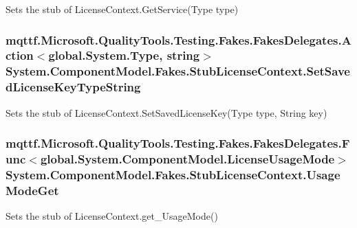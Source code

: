 Sets the stub of License\-Context.\-Get\-Service(\-Type type)

\hypertarget{class_system_1_1_component_model_1_1_fakes_1_1_stub_license_context_a175c2d501eff69e06826e0c844192437}{
\subsubsection[{Set\-Saved\-License\-Key\-Type\-String}]{\setlength{\rightskip}{0pt plus 5cm}mqttf.\-Microsoft.\-Quality\-Tools.\-Testing.\-Fakes.\-Fakes\-Delegates.\-Action$<$global.\-System.\-Type, string$>$ System.\-Component\-Model.\-Fakes.\-Stub\-License\-Context.\-Set\-Saved\-License\-Key\-Type\-String}}\label{class_system_1_1_component_model_1_1_fakes_1_1_stub_license_context_a175c2d501eff69e06826e0c844192437}


Sets the stub of License\-Context.\-Set\-Saved\-License\-Key(\-Type type, String key)

\hypertarget{class_system_1_1_component_model_1_1_fakes_1_1_stub_license_context_afb6091f3d8e76d05287fa5e50b857d3d}{
\subsubsection[{Usage\-Mode\-Get}]{\setlength{\rightskip}{0pt plus 5cm}mqttf.\-Microsoft.\-Quality\-Tools.\-Testing.\-Fakes.\-Fakes\-Delegates.\-Func$<$global.\-System.\-Component\-Model.\-License\-Usage\-Mode$>$ System.\-Component\-Model.\-Fakes.\-Stub\-License\-Context.\-Usage\-Mode\-Get}}\label{class_system_1_1_component_model_1_1_fakes_1_1_stub_license_context_afb6091f3d8e76d05287fa5e50b857d3d}


Sets the stub of License\-Context.\-get\-\_\-\-Usage\-Mode()



